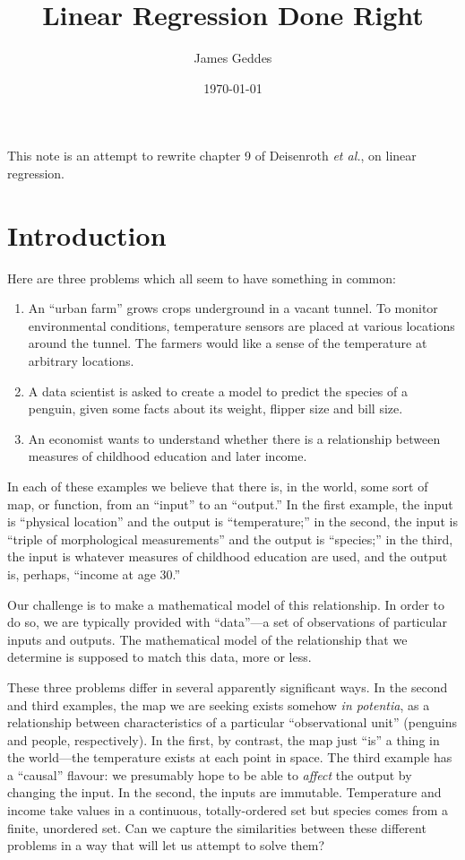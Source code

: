 \documentclass[11pt, a4paper]{article}
\author{James Geddes}
\date{\today}
\title{Linear Regression Done Right}
\begin{document}
\maketitle

This note is an attempt to rewrite chapter 9 of Deisenroth \emph{et
al.}, on linear regression.

\section*{Introduction}

Here are three problems which all seem to have something in common:

\begin{enumerate}
\item An ``urban farm'' grows crops underground in a vacant tunnel. To
  monitor environmental conditions, temperature sensors are placed at
  various locations around the tunnel. The farmers would like a sense
  of the temperature at arbitrary locations.
\item A data scientist is asked to create a model to predict the
  species of a penguin, given some facts about its weight, flipper
  size and bill size.
\item An economist wants to understand whether there is a relationship
  between measures of childhood education and later income.
\end{enumerate}

In each of these examples we believe that there is, in the world, some
sort of map, or function, from an “input” to an “output.” In the first
example, the input is “physical location” and the output is
“temperature;” in the second, the input is “triple of morphological
measurements” and the output is “species;” in the third, the input is
whatever measures of childhood education are used, and the output is,
perhaps, “income at age 30.”

Our challenge is to make a mathematical model of this relationship. In
order to do so, we are typically provided with “data”---a set of
observations of particular inputs and outputs. The mathematical model
of the relationship that we determine is supposed to match this data,
more or less.

These three problems differ in several apparently significant
ways. In the second and third examples, the map we are seeking exists
somehow \emph{in potentia}, as a relationship between characteristics
of a particular “observational unit” (penguins and people,
respectively). In the first, by contrast, the map just “is” a thing in
the world---the temperature exists at each point in space. The third
example has a “causal” flavour: we presumably hope to be able to
\emph{affect} the output by changing the input. In the second, the
inputs are immutable. Temperature and income take values in a
continuous, totally-ordered set but species comes from a finite,
unordered set. Can we capture the similarities between these different
problems in a way that will let us attempt to solve them?
\end{document}
